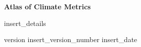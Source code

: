 \begin{titlepage}
    \begin{center}

        \vspace*{5cm}
        
        \Huge
        \textbf{Atlas of Climate Metrics}
        
        \vspace{0.5cm}
        \LARGE
        insert_details
        
        \vfill
        
        version insert_version_number
        insert_date
        
        
    \end{center}
\end{titlepage}
